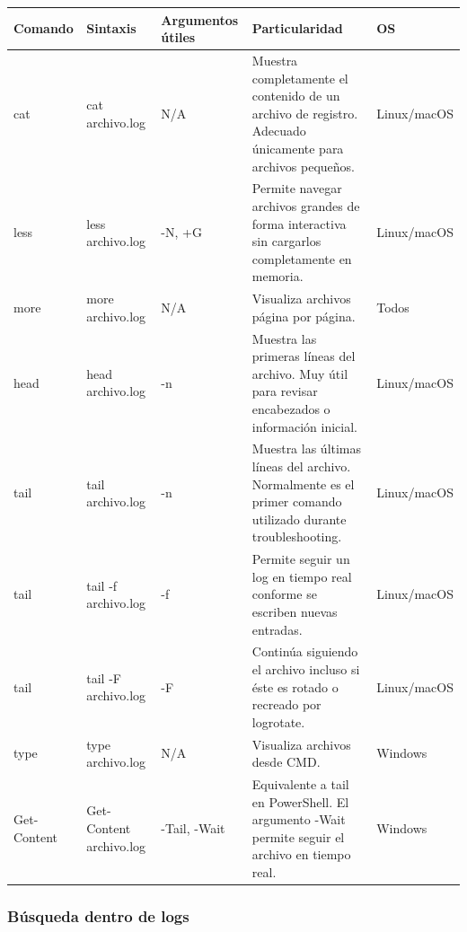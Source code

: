 \documentclass[a4paper,10pt]{article}
\begin{document}
\begin{longtable}{|p{2.8cm}|p{3.3cm}|p{4cm}|p{5.3cm}|p{1.5cm}|}

\hline
Comando &
Sintaxis &
Argumentos útiles &
Particularidad &
OS
\\
\hline
\endhead

cat &
cat archivo.log &
N/A &
Muestra completamente el contenido de un archivo de registro. Adecuado únicamente para archivos pequeños. &
Linux/macOS
\\
\hline

less &
less archivo.log &
-N, +G &
Permite navegar archivos grandes de forma interactiva sin cargarlos completamente en memoria. &
Linux/macOS
\\
\hline

more &
more archivo.log &
N/A &
Visualiza archivos página por página. &
Todos
\\
\hline

head &
head archivo.log &
-n &
Muestra las primeras líneas del archivo. Muy útil para revisar encabezados o información inicial. &
Linux/macOS
\\
\hline

tail &
tail archivo.log &
-n &
Muestra las últimas líneas del archivo. Normalmente es el primer comando utilizado durante troubleshooting. &
Linux/macOS
\\
\hline

tail &
tail -f archivo.log &
-f &
Permite seguir un log en tiempo real conforme se escriben nuevas entradas. &
Linux/macOS
\\
\hline

tail &
tail -F archivo.log &
-F &
Continúa siguiendo el archivo incluso si éste es rotado o recreado por logrotate. &
Linux/macOS
\\
\hline

type &
type archivo.log &
N/A &
Visualiza archivos desde CMD. &
Windows
\\
\hline

Get-Content &
Get-Content archivo.log &
-Tail, -Wait &
Equivalente a tail en PowerShell. El argumento -Wait permite seguir el archivo en tiempo real. &
Windows
\\
\hline

\end{longtable}


\subsubsection{Búsqueda dentro de logs}
\end{document}
